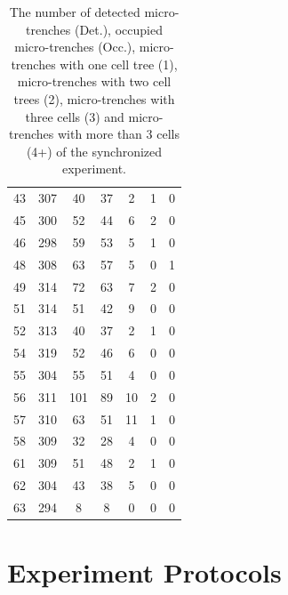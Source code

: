 \documentclass[pdftex,12pt,a4paper]{report}
\begin{document}
\begin{appendices}
\begin{table}[H]
\begin{tabular}[t]{ c | c | c | c | c | c | c }
43 & 307 & 40 & 37 & 2 & 1 & 0
\\
45 & 300 & 52 & 44 & 6 & 2 & 0
\\
46 & 298 & 59 & 53 & 5 & 1 & 0
\\
48 & 308 & 63 & 57 & 5 & 0 & 1
\\
49 & 314 & 72 & 63 & 7 & 2 & 0
\\
51 & 314 & 51 & 42 & 9 & 0 & 0
\\
52 & 313 & 40 & 37 & 2 & 1 & 0
\\
54 & 319 & 52 & 46 & 6 & 0 & 0
\\
55 & 304 & 55 & 51 & 4 & 0 & 0
\\
56 & 311 & 101 & 89 & 10 & 2 & 0
\\
57 & 310 & 63 & 51 & 11 & 1 & 0
\\
58 & 309 & 32 & 28 & 4 & 0 & 0
\\
61 & 309 & 51 & 48 & 2 & 1 & 0
\\
62 & 304 & 43 & 38 & 5 & 0 & 0
\\
63 & 294 & 8 & 8 & 0 & 0 & 0
\\
\hline
\end{tabular}
\caption[The occupancy statistics of the synchronized experiment]{The number of detected micro-trenches (Det.), occupied micro-trenches (Occ.), micro-trenches with one cell tree (1), micro-trenches with two cell trees (2), micro-trenches with three cells (3) and micro-trenches with more than 3 cells (4+) of the synchronized experiment.}
\end{table}
\label{table:occupancy_statistics_syn}
\chapter{Experiment Protocols}





\end{appendices}
\end{document}
